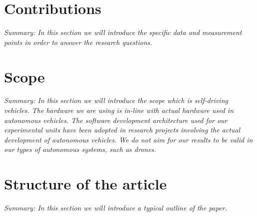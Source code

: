\section{Contributions}
\textit{Summary: In this section we will introduce the specific data and measurement points in order to answer the research questions.} 


\section{Scope}
\textit{Summary: In this section we will introduce the scope which is self-driving vehicles. The hardware we are using is in-line with actual hardware used in autonomous vehicles. The software development architecture used for our experimental units have been adopted in research projects involving the actual development of autonomous vehicles. We do not aim for our results to be valid in our types of autonomous systems, such as drones. }

\section{Structure of the article}

\textit{Summary: In this section we will introduce a typical outline of the paper.}


	